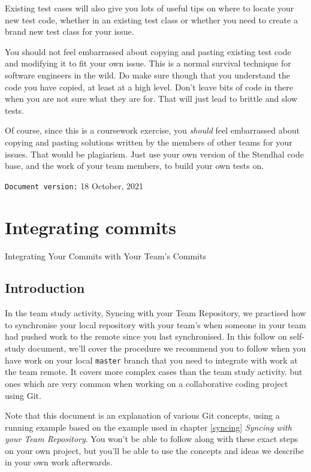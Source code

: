 \documentclass[
]{book}
\begin{document}
Existing test cases will also give you lots of useful tips on where to locate your new test code, whether in an existing test class or whether you need to create a brand new test class for your issue.

You should not feel embarrassed about copying and pasting existing test code and modifying it to fit your own issue. This is a normal survival technique for software engineers in the wild. Do make sure though that you understand the code you have copied, at least at a high level. Don't leave bits of code in there when you are not sure what they are for. That will just lead to brittle and slow tests.

Of course, since this is a coursework exercise, you \emph{should} feel embarrassed about copying and pasting solutions written by the members of other teams for your issues. That would be plagiarism. Just use your own version of the Stendhal code base, and the work of your team members, to build your own tests on.

\texttt{Document\ version:} 18 October, 2021

\hypertarget{committing}{%
\chapter{Integrating commits}\label{committing}}

Integrating Your Commits with Your Team's Commits

\hypertarget{commintro}{%
\section{Introduction}\label{commintro}}

In the team study activity, Syncing with your Team Repository, we practised how to synchronise your local repository with your team's when someone in your team had pushed work to the remote since you last synchronised. In this follow on self-study document, we'll cover the procedure we recommend you to follow when you have work on your local \texttt{master} branch that you need to integrate with work at the team remote. It covers more complex cases than the team study activity. but ones which are very common when working on a collaborative coding project using Git.

Note that this document is an explanation of various Git concepts, using a running example based on the example used in chapter \ref{syncing} \emph{Syncing with your Team Repository}. You won't be able to follow along with these exact steps on your own project, but you'll be able to use the concepts and ideas we describe in your own work afterwards.
\end{document}
